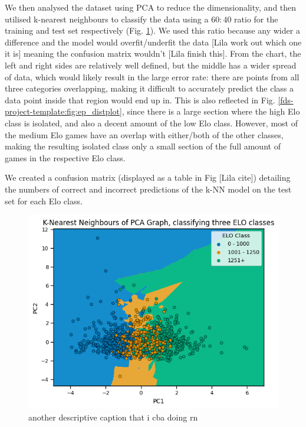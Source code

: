 \documentclass[10pt,a4paper]{article}
\begin{document}
\begin{multicols}{2}
We then analysed the dataset using PCA to reduce the dimensionality, and then utilised k-nearest neighbours to classify the data using a $60:40$ ratio for the training and test set respectively (Fig. \ref{fds-project-template:fig:knn}). We used this ratio because any wider a difference and the model would overfit/underfit the data [Lila work out which one it is] meaning the confusion matrix wouldn't [Lila finish this]. \newline
From the chart, the left and right sides are relatively well defined, but the middle has a wider spread of data, which would likely result in the large error rate: there are points from all three categories overlapping, making it difficult to accurately predict the class a data point inside that region would end up in. This is also reflected in Fig. \ref{fds-project-template:fig:ep_distplot}, since there is a large section where the high Elo class is isolated, and also a decent amount of the low Elo class. However, most of the medium Elo games have an overlap with either/both of the other classes, making the resulting isolated class only 
a small section of the full amount of games in the respective Elo class.\newline

We created a confusion matrix (displayed as a table in Fig [Lila cite]) detailing the numbers of correct and incorrect predictions of the k-NN model on the test set for each Elo class. 

\begin{figure}[t]
  \centering
  \includegraphics[width=\textwidth]{report/images/knn_graph.png}
  \caption{another descriptive caption that i cba doing rn}
  \label{fds-project-template:fig:knn}
\end{figure}


\end{multicols}
\end{document}
